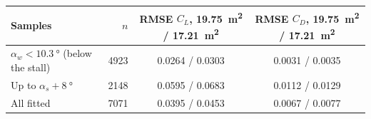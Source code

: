 \begin{tabular}{lrcc}
\toprule
Samples & $n$ & RMSE $C_L$, \SI{19.75}{\square\metre} / \SI{17.21}{\square\metre} & RMSE $C_D$, \SI{19.75}{\square\metre} / \SI{17.21}{\square\metre} \\
\midrule
$\alpha_w<\SI{10.3}{\degree}$ (below the stall) & 4923 & 0.0264 / 0.0303 & 0.0031 / 0.0035 \\
Up to $\alpha_s+\SI{8}{\degree}$ & 2148 & 0.0595 / 0.0683 & 0.0112 / 0.0129 \\
All fitted & 7071 & 0.0395 / 0.0453 & 0.0067 / 0.0077 \\
\bottomrule
\end{tabular}

